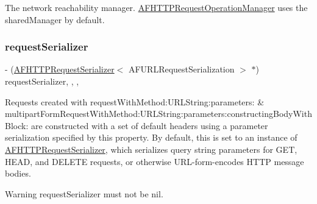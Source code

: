 The network reachability manager. {\ttfamily \mbox{\hyperlink{interface_a_f_h_t_t_p_request_operation_manager}{A\+F\+H\+T\+T\+P\+Request\+Operation\+Manager}}} uses the {\ttfamily shared\+Manager} by default. \mbox{\label{interface_a_f_h_t_t_p_request_operation_manager_a81423c1c26923a95e78139b234506c88}} 
\subsubsection{\texorpdfstring{request\+Serializer}{requestSerializer}}
{\footnotesize\ttfamily -\/ (\mbox{\hyperlink{interface_a_f_h_t_t_p_request_serializer}{A\+F\+H\+T\+T\+P\+Request\+Serializer}}$<$ A\+F\+U\+R\+L\+Request\+Serialization $>$ $\ast$) request\+Serializer\hspace{0.3cm}{\ttfamily [read]}, {\ttfamily [write]}, {\ttfamily [nonatomic]}, {\ttfamily [strong]}}

Requests created with {\ttfamily request\+With\+Method\+:\+U\+R\+L\+String\+:parameters\+:} \& {\ttfamily multipart\+Form\+Request\+With\+Method\+:\+U\+R\+L\+String\+:parameters\+:constructing\+Body\+With\+Block\+:} are constructed with a set of default headers using a parameter serialization specified by this property. By default, this is set to an instance of {\ttfamily \mbox{\hyperlink{interface_a_f_h_t_t_p_request_serializer}{A\+F\+H\+T\+T\+P\+Request\+Serializer}}}, which serializes query string parameters for {\ttfamily G\+ET}, {\ttfamily H\+E\+AD}, and {\ttfamily D\+E\+L\+E\+TE} requests, or otherwise U\+R\+L-\/form-\/encodes H\+T\+TP message bodies.

\begin{DoxyWarning}{Warning}
{\ttfamily request\+Serializer} must not be {\ttfamily nil}. 
\end{DoxyWarning}
\mbox{\label{interface_a_f_h_t_t_p_request_operation_manager_a349081285ff4f5b11c474fce0f8345fc}} 
